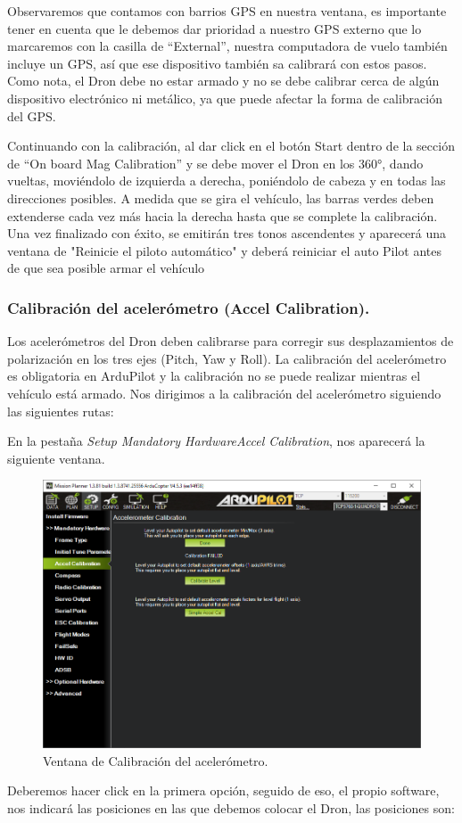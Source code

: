 Observaremos que contamos con barrios GPS en nuestra ventana, es importante tener en cuenta que le debemos dar prioridad a nuestro GPS externo que lo marcaremos con la casilla de “External”, nuestra computadora de vuelo también incluye un GPS, así que ese dispositivo también sa calibrará con estos pasos.
Como nota, el Dron debe no estar armado y no se debe calibrar cerca de algún dispositivo electrónico ni metálico, ya que puede afectar la forma de calibración del GPS.

Continuando con la calibración, al dar click en el botón Start dentro de la sección de “On board Mag Calibration” y se debe mover el Dron en los 360°, dando vueltas, moviéndolo de izquierda a derecha, poniéndolo de cabeza y en todas las direcciones posibles.
A medida que se gira el vehículo, las barras verdes deben extenderse cada vez más hacia la derecha hasta que se complete la calibración.
Una vez finalizado con éxito, se emitirán tres tonos ascendentes y aparecerá una ventana de "Reinicie el piloto automático" y deberá reiniciar el auto Pilot antes de que sea posible armar el vehículo


\subsubsection{Calibración del acelerómetro (Accel Calibration).}

Los acelerómetros del Dron deben calibrarse para corregir sus desplazamientos de polarización en los tres ejes (Pitch, Yaw y Roll). La calibración del acelerómetro es obligatoria en ArduPilot y la calibración no se puede realizar mientras el vehículo está armado.
Nos dirigimos a la calibración del acelerómetro siguiendo las siguientes rutas:

En la pestaña \textit{Setup} \textrightarrow \textit{Mandatory Hardware}\textrightarrow \textit{Accel Calibration}, nos aparecerá la siguiente ventana.

\begin{figure}[H]
	\centering
	\includegraphics[width=0.9\linewidth]{imagenes/accel}
	\caption{Ventana de Calibración del acelerómetro.}
	\label{fig:accel}
\end{figure}
\newpage
Deberemos hacer click en la primera opción, seguido de eso, el propio software, nos indicará las posiciones en las que debemos colocar el Dron, las posiciones son:

